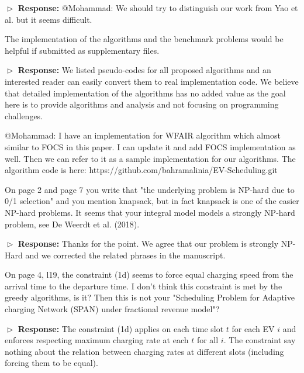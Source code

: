 \documentclass[11pt]{article}
\begin{document}
$\vartriangleright$ \noindent\textbf{Response:} 
{\color{red}@Mohammad: We should try to distinguish our work from Yao et al. but it seems difficult.}

\vspace{3mm}
{\color{blue} The implementation of the algorithms and the benchmark problems would be helpful if submitted as supplementary files. }
\vspace{3mm}

$\vartriangleright$ \noindent\textbf{Response:} 
We listed pseudo-codes for all proposed algorithms and an interested reader can easily convert them to real implementation code. We believe that detailed implementation of the algorithms has no added value as the goal here is to provide algorithms and analysis and not focusing on programming challenges.

{\color{red} @Mohammad: I have an implementation for WFAIR algorithm which almost similar to FOCS in this paper. I can update it and add FOCS implementation as well. 
Then we can refer to it as a sample implementation for our algorithms. The algorithm code is 
here: https://github.com/bahramalinia/EV-Scheduling.git}
  
\vspace{3mm}
{\color{blue} On page 2 and page 7 you write that "the underlying problem is NP-hard due to 0/1 selection" and you mention knapsack, but in fact knapsack is one of the easier NP-hard problems. It seems that your integral model models a strongly NP-hard problem, see De Weerdt et al. (2018). }
\vspace{3mm}

$\vartriangleright$ \noindent\textbf{Response:} 
Thanks for the point. We agree that our problem is strongly NP-Hard and we corrected the related phrases in the manuscript.

\vspace{3mm}
{\color{blue} On page 4, l19, the constraint (1d) seems to force equal charging speed from the arrival time to the departure time. I don't think this constraint is met by the greedy algorithms, is it? Then this is not your "Scheduling Problem for Adaptive charging Network (SPAN) under fractional revenue model"? }
\vspace{3mm}

$\vartriangleright$ \noindent\textbf{Response:} 
The constraint (1d) applies on each time slot $t$ for each EV $i$ and enforces respecting maximum charging rate at each $t$ for all $i$. The constraint say nothing about the relation between charging rates at different slots (including forcing them to be equal).
\end{document}
